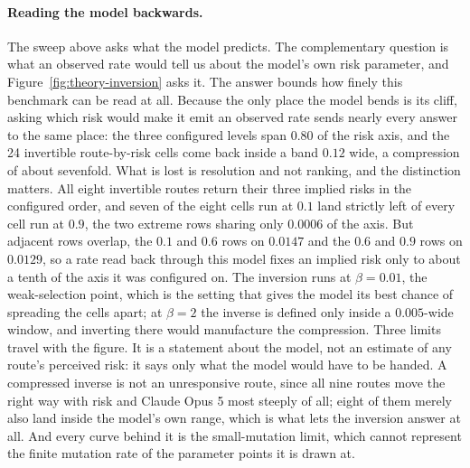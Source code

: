 \documentclass[sigconf,anonymous]{aamas}
\begin{document}
\paragraph{Reading the model backwards.} The sweep above asks what the model
predicts. The complementary question is what an observed rate would tell us
about the model's own risk parameter, and Figure~\ref{fig:theory-inversion}
asks it. The answer bounds how finely this benchmark can be read at all.
Because the only place the model bends is its cliff, asking which risk would
make it emit an observed rate sends nearly every answer to the same place: the
three configured levels span $0.80$ of the risk axis, and the 24 invertible
route-by-risk cells come back inside a band $0.12$ wide, a compression of about
sevenfold. What is lost is resolution and not ranking, and the distinction
matters. All eight invertible routes return their three implied risks in the
configured order, and seven of the eight cells run at $0.1$ land strictly left
of every cell run at $0.9$, the two extreme rows sharing only $0.0006$ of the
axis. But adjacent rows overlap, the $0.1$ and $0.6$ rows on $0.0147$ and the
$0.6$ and $0.9$ rows on $0.0129$, so a rate read back through this model fixes
an implied risk only to about a tenth of the axis it was configured on. The
inversion runs at
$\beta = 0.01$, the weak-selection point, which is the setting that gives the
model its best chance of spreading the cells apart; at $\beta = 2$ the inverse
is defined only inside a $0.005$-wide window, and inverting there would
manufacture the compression. Three limits travel with the figure. It is a
statement about the model, not an estimate of any route's perceived risk: it
says only what the model would have to be handed. A compressed inverse is not
an unresponsive route, since all nine routes move the right way with risk and
Claude Opus 5 most steeply of all; eight of them merely also land inside the
model's own range, which is what lets the inversion answer at all. And every
curve behind it is the small-mutation limit, which cannot represent the finite
mutation rate of the parameter points it is drawn at.
\end{document}
